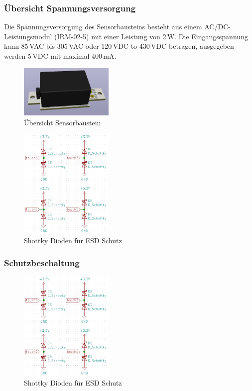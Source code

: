 \subsubsection{Übersicht Spannungsversorgung}
Die Spannungsversorgung des Sensorbausteins besteht aus einem AC/DC-Leistungsmodul (IRM-02-5) mit einer Leistung von 2\,W. Die Eingangsspannung kann 85\,VAC bis 305\,VAC oder 120\,VDC to 430\,VDC betragen, ausgegeben werden 5\,VDC mit maximal 400\,mA.
\begin{figure}[H]
	\centering
	\includegraphics[width=0.4\textwidth]{graphics/Spannungsversorgung.png}
	\caption{Übersicht Sensorbaustein}
	\label{pic: Spannungsversorgung}
\end{figure} 

\begin{figure}[h!]
	\centering
	\includegraphics[width=0.4\textwidth]{graphics/shematics_sensor_Shottky.png}
	\caption{Shottky Dioden für ESD Schutz}
	\label{pic: Sensor_Shottky}
\end{figure}

\subsubsection{Schutzbeschaltung}

\begin{figure}[h!]
	\centering
	\includegraphics[width=0.4\textwidth]{graphics/shematics_sensor_Shottky.png}
	\caption{Shottky Dioden für ESD Schutz}
	\label{pic: Sensor_Shottky}
\end{figure}


